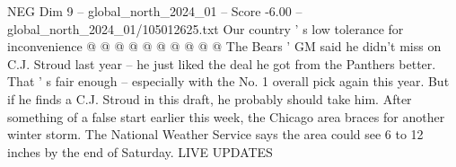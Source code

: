 \begin{textsample}{NEG Dim 9 – global\_north\_2024\_01 – Score -6.00 – global\_north\_2024\_01/105012625.txt}
Our country ' s low tolerance for inconvenience @ @ @ @ @ @ @ @ @ @ The Bears ' GM said he didn't miss on C.J.
Stroud last year -- he just liked the deal he got from the Panthers better.
That ' s fair enough -- especially with the No. 1 overall pick again this year.
But if he finds a C.J.
Stroud in this draft, he probably should take him.
After something of a false start earlier this week, the Chicago area braces for another winter storm.
The National Weather Service says the area could see 6 to 12 inches by the end of Saturday.
LIVE UPDATES

\end{textsample}

